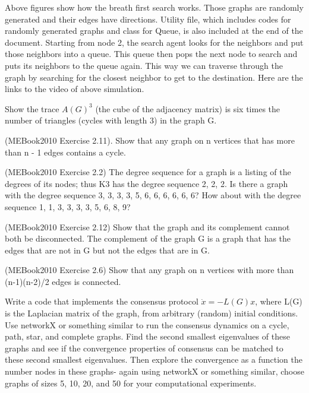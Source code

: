 \documentclass{article}
\begin{document}
\begin{problem}
\begin{figure}[!h]
\end{figure}
Above figures show how the breath first search works. Those graphs are randomly generated and their edges have directions. Utility file, which includes codes for randomly generated graphs and class for Queue, is also included at the end of the document. Starting from node 2, the search agent looks for the neighbors and put those neighbors into a queue. This queue then pops the next node to search and puts its neighbors to the queue again. This way we can traverse through the graph by searching for the closest neighbor to get to the destination. Here are the links to the video of above simulation.

\end{problem}

\begin{problem}
    Show the trace $A(G)^3$ (the cube of the adjacency matrix) is six times the number of triangles (cycles with length 3) in the graph G.
\end{problem}


\begin{problem}
    (MEBook2010 Exercise 2.11). Show that any graph on n vertices that has more than n - 1 edges contains a cycle.
\end{problem}

\begin{problem}
    (MEBook2010 Exercise 2.2) The degree sequence for a graph is a listing of the degrees of its nodes; thus K3 has the degree sequence 2, 2, 2. Is there a graph with the degree sequence 3, 3, 3, 3, 5, 6, 6, 6, 6, 6, 6? How about with the degree sequence 1, 1, 3, 3, 3, 3, 5, 6, 8, 9?

\end{problem}

\begin{problem}
    (MEBook2010 Exercise 2.12) Show that the graph and its complement cannot both be disconnected. The complement of the graph G is a graph that has the edges that are not in G but not the edges that are in G.
        
\end{problem}

\begin{problem}
    (MEBook2010 Exercise 2.6) Show that any graph on n vertices with more than (n-1)(n-2)/2 edges is connected.
  
\end{problem}

\begin{problem}
    Write a code that implements the consensus protocol  $\dot{x}=-L(G) x$, where L(G) is the Laplacian matrix of the graph,  from arbitrary (random) initial conditions. Use networkX or something similar to run the consensus dynamics on a cycle, path, star, and complete graphs. Find the second smallest eigenvalues of these graphs and see if the convergence properties of consensus  can be matched to these second smallest eigenvalues. Then explore the convergence as a function the number  nodes in these graphs- again using networkX or something similar, choose graphs of sizes 5, 10, 20, and 50 for your computational experiments.
\end{problem}
\end{document}
